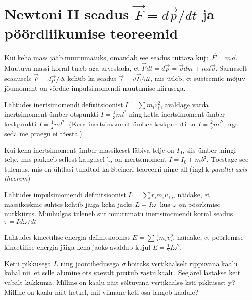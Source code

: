 \documentclass[a4paper,11pt,twocolumn]{article}
\begin{document}
\section{Newtoni II seadus $ \vec{F}=d\vec{p}/dt $ ja pöördliikumise teoreemid}
Kui keha mass jääb muutumatuks, omandab see seadus tuttava kuju $ \vec{F}=m\vec{a} $. Muutuva massi korral tuleb aga arvestada, et $ \vec{F}dt=d\vec{p}=\vec{v}dm+md\vec{v} $. Sarnaselt seadusele $ \vec{F}=d\vec{p}/dt $ kehtib ka seadus $ \vec{\tau}=d\vec{L}/dt $, mis ütleb, et süsteemile mõjuv jõumoment on võrdne impulsimomendi muutumise kiirusega.
\begin{question}
	Lähtudes inertsimomendi definitsioonist $ I=\sum m_i r_i^2 $, avaldage varda inertsimoment ümber otspunkti $ I=\frac{1}{3}ml^2 $ ning ketta inertsimoment ümber keskpunkti $ I=\frac{1}{2}ml^2 $. (Kera inertsimoment ümber keskpunkti on $ I=\frac{2}{5}ml^2 $, aga seda me praegu ei tõesta.)
\end{question}
\begin{question}
	Kui keha inertsimoment ümber massikeset läbiva telje on $ I_0 $, siis ümber mingi telje, mis paikneb sellest kaugusel b, on inertsimoment $ I=I_0+mb^2 $. Tõestage see tulemus, mis on ühtlasi tundtud ka Steineri teoreemi nime all (ingl k \textit{parallel axis theorem}).
\end{question}
\begin{question}
Lähtudes impulsimomendi definitsioonist $ L=\sum r_im_iv_{\bot i} $, näidake, et massikeskme suhtes kehtib jäiga keha jaoks $ L=I\omega $, kus $ \omega $ on pöörlemise nurkkiirus. Muuhulgas tuleneb siit muutumatu inertsimomendi korral seadus $ \tau =Id\omega/dt$
\end{question}
\begin{question}
	Lähtudes kineetilise energia definitsioonist $ E=\sum \frac{1}{2}m_i v_i^{2}$, näidake, et pöörlemise kineetiline energia jäiga keha jaoks avaldub kujul $ E=\frac{1}{2}I\omega^{2} $.	
\end{question}
\begin{question}
	Ketti pikkusega $ L $ ning joontihedusega $ \sigma $ hoitaks vertikaalselt rippuvana kaalu kohal nii, et selle alumine ots vaevalt puutub vastu kaalu. Seejärel lastakse kett vabalt kukkuma. Milline on kaalu näit sõltuvana vertikaalse keti pikkusest y? Milline on kaalu näit hetkel, mil viimane keti osa langeb kaalule?
\end{question}
\end{document}
